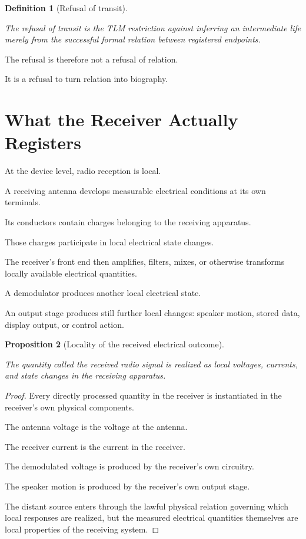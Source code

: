 \documentclass[12pt,onecolumn]{article}
\newtheorem{proposition}{Proposition}[section]
\newtheorem{definition}[proposition]{Definition}
\begin{document}
\begin{definition}[Refusal of transit]
\label{def:refusal}

The refusal of transit is the TLM restriction against inferring an
intermediate life merely from the successful formal relation between
registered endpoints.

\end{definition}

The refusal is therefore not a refusal of relation.

It is a refusal to turn relation into biography.

\section{What the Receiver Actually Registers}

At the device level, radio reception is local.

A receiving antenna develops measurable electrical conditions at its own
terminals.

Its conductors contain charges belonging to the receiving apparatus.

Those charges participate in local electrical state changes.

The receiver's front end then amplifies, filters, mixes, or otherwise
transforms locally available electrical quantities.

A demodulator produces another local electrical state.

An output stage produces still further local changes: speaker motion,
stored data, display output, or control action.

\begin{proposition}[Locality of the received electrical outcome]
\label{prop:localoutcome}

The quantity called the received radio signal is realized as local
voltages, currents, and state changes in the receiving apparatus.

\end{proposition}

\begin{proof}

Every directly processed quantity in the receiver is instantiated in the
receiver's own physical components.

The antenna voltage is the voltage at the antenna.

The receiver current is the current in the receiver.

The demodulated voltage is produced by the receiver's own circuitry.

The speaker motion is produced by the receiver's own output stage.

The distant source enters through the lawful physical relation governing
which local responses are realized, but the measured electrical
quantities themselves are local properties of the receiving system.

\end{proof}
\end{document}
